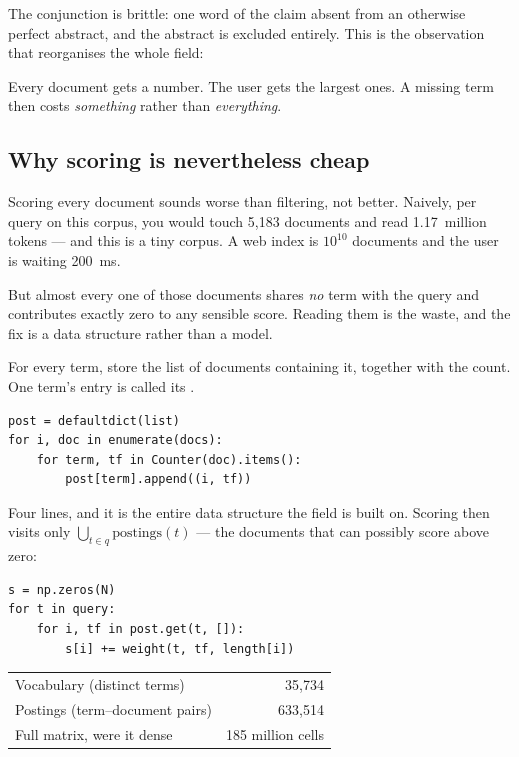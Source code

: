 \documentclass[11pt,a4paper]{article}
\begin{document}
The conjunction is brittle: one word of the claim absent from an otherwise
perfect abstract, and the abstract is excluded entirely. This is the
observation that reorganises the whole field:

\begin{keybox}[title={Stop filtering; start scoring}]
Every document gets a number. The user gets the largest ones. A missing term
then costs \emph{something} rather than \emph{everything}.
\end{keybox}

\subsection{Why scoring is nevertheless cheap}

Scoring every document sounds worse than filtering, not better. Naively, per
query on this corpus, you would touch 5{,}183 documents and read 1.17~million
tokens --- and this is a tiny corpus. A web index is $10^{10}$ documents and
the user is waiting 200~ms.

But almost every one of those documents shares \emph{no} term with the query
and contributes exactly zero to any sensible score. Reading them is the waste,
and the fix is a data structure rather than a model.

\begin{definition}
For every term, store the list of documents containing it, together with the
count. One term's entry is called its .
\end{definition}

\begin{verbatim}
post = defaultdict(list)
for i, doc in enumerate(docs):
    for term, tf in Counter(doc).items():
        post[term].append((i, tf))
\end{verbatim}

Four lines, and it is the entire data structure the field is built on. Scoring
then visits only $\bigcup_{t \in q} \text{postings}(t)$ --- the documents that
can possibly score above zero:

\begin{verbatim}
s = np.zeros(N)
for t in query:
    for i, tf in post.get(t, []):
        s[i] += weight(t, tf, length[i])
\end{verbatim}

\begin{center}
\small
\begin{tabular}{lr}
\toprule
Vocabulary (distinct terms)      & 35{,}734 \\
Postings (term--document pairs)  & 633{,}514 \\
Full matrix, were it dense       & 185 million cells \\
\bottomrule
\end{tabular}
\end{center}
\end{document}
